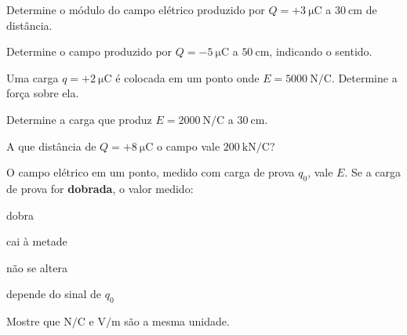 \blocofixacao
\begin{questao}[1]{}

Determine o módulo do campo elétrico produzido por $Q=+\SI{3}{\micro\coulomb}$
a $\SI{30}{\centi\meter}$ de distância.


\end{questao}
\begin{questao}[1]{}

Determine o campo produzido por $Q=-\SI{5}{\micro\coulomb}$ a
$\SI{50}{\centi\meter}$, indicando o sentido.


\end{questao}
\begin{questao}[1]{}

Uma carga $q=+\SI{2}{\micro\coulomb}$ é colocada em um ponto onde
$E=\SI{5000}{\newton\per\coulomb}$. Determine a força sobre ela.


\end{questao}
\begin{questao}[1]{}

Determine a carga que produz $E=\SI{2000}{\newton\per\coulomb}$ a
$\SI{30}{\centi\meter}$.


\end{questao}
\begin{questao}[1]{}

A que distância de $Q=+\SI{8}{\micro\coulomb}$ o campo vale
$\SI{200}{\kilo\newton\per\coulomb}$?


\end{questao}
\begin{questao}[1]{}

O campo elétrico em um ponto, medido com carga de prova $q_0$, vale $E$. Se a
carga de prova for \textbf{dobrada}, o valor medido:
\begin{alternativas}[2]
\item dobra
\item cai à metade
\item não se altera
\item depende do sinal de $q_0$
\end{alternativas}


\end{questao}
\begin{questao}[1]{}

Mostre que $\si{\newton\per\coulomb}$ e $\si{\volt\per\meter}$ são a mesma
unidade.


\end{questao}
